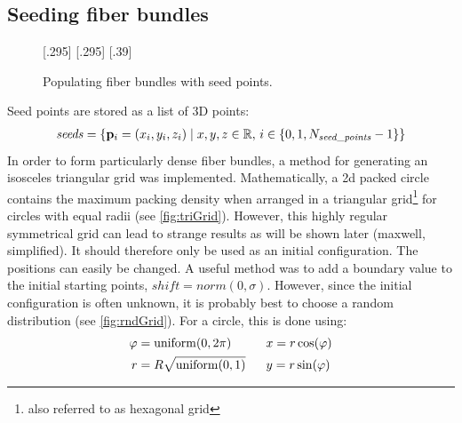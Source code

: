 \subsection{Seeding fiber bundles}\label{sec:seeds}
% 
\begin{figure}[!t]
    \def\tikzheight{0.25\textwidth}
    \centering
    [.295\textwidth]{
    \hfill}
    [.295\textwidth]{
    }\hfill
    [.39\textwidth]{
    \hfill}
	\caption{Populating fiber bundles with seed points.}
\end{figure}
% 
Seed points are stored as a list of 3D points:
\begin{align}
\mathit{seeds} = \left\{ \mathbf{p}_i=(x_i,y_i,z_i) \mid x,y,z \in \mathbb{R} , \, i \in \{0,1,N_{\mathit{seed\_points}}-1\}\right\}
\end{align}
% 
In order to form particularly dense fiber bundles, a method for generating an isosceles triangular grid was implemented.
Mathematically, a 2d packed circle contains the maximum packing density when arranged in a triangular grid\footnote{also referred to as hexagonal grid} for circles with equal radii (see \ref{fig:triGrid}).
However, this highly regular symmetrical grid can lead to strange results as will be shown later (\eg maxwell, simplified).
It should therefore only be used as an initial configuration. 
The positions can easily be changed.
A useful method was to add a boundary value to the initial starting points, \eg $\mathit{shift} = norm(0,\sigma)$.
However, since the initial configuration is often unknown, it is probably best to choose a random distribution (see \cref{fig:rndGrid}).
For a circle, this is done using:
\begin{equation}
\begin{aligned}
 \varphi &= \mathrm{uniform}(0,2 \pi) \hspace{4.2ex} && x = r \cos(\varphi)\\
 r &= R \sqrt{\mathrm{uniform}(0,1)} && y = r \sin(\varphi)
\end{aligned}
\end{equation}
% 
